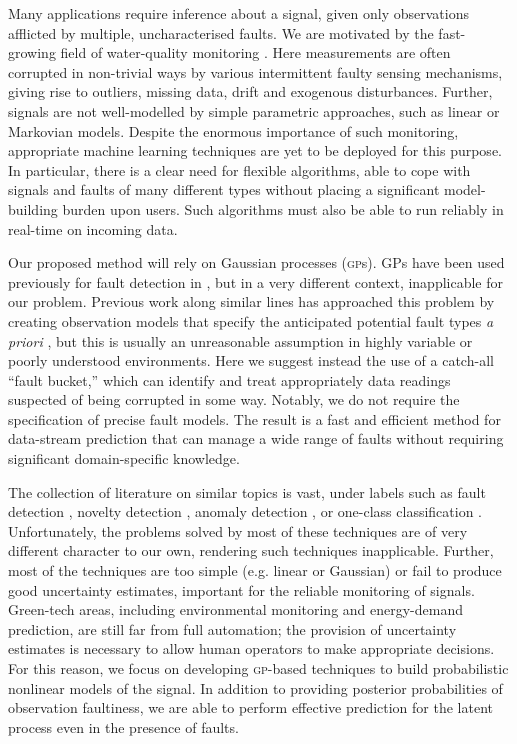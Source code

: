 \documentclass{article} %
\newcommand{\acro}[1]{\textsc{#1}}
\begin{document}
Many applications require inference about a signal, given only observations afflicted by multiple, uncharacterised faults. We are motivated by the fast-growing field of water-quality monitoring
\citep{wagner2006guidelines}. Here measurements are often corrupted in non-trivial ways by various intermittent faulty sensing mechanisms, giving rise to outliers, missing data, drift and exogenous disturbances. Further, signals are not well-modelled by simple parametric approaches, such as linear or Markovian models. Despite the enormous importance of
such monitoring, appropriate machine learning techniques are yet to be deployed for this purpose. In particular, there is a clear need for flexible algorithms, able to cope with signals and faults of many different types without placing a significant model-building burden upon users. Such algorithms must also be able to run reliably in real-time on incoming data.

Our proposed method will rely on Gaussian processes (\acro{gp}s). GPs have been used previously for fault detection in \citep{Eciolaza2001}, but in a very different context, inapplicable for our problem. Previous work along similar lines has
approached this problem by creating observation models that specify
the anticipated potential fault types \textit{a priori}
\citep{garnettosborne}, but this is usually an unreasonable assumption
in highly variable or poorly understood environments.  Here we suggest instead
the use of a catch-all ``fault bucket,'' which can identify and treat
appropriately data readings suspected of being corrupted in some way. Notably, we do not require the specification of precise fault models. 
The result is a fast and efficient method for data-stream prediction that can manage a
wide range of faults without requiring significant
domain-specific knowledge.

The collection of literature on similar topics is vast, under labels
such as fault detection \citep{Eciolaza2001, deFreitas1996,
  Isermann2005, Ding2008}, novelty detection \citep{Markou2003},
anomaly detection \citep{Chandola:2009}, or one-class classification
\citep{Khan2010}. Unfortunately, the problems solved by most of these techniques are of very different character to our own, rendering such techniques inapplicable. Further, most of the techniques are too simple
(e.g. linear or Gaussian) or fail to produce good uncertainty
estimates, important for the reliable monitoring of
signals. Green-tech areas, including environmental monitoring and
energy-demand prediction, are still far from full
automation; the provision of uncertainty estimates is necessary to allow human operators to make appropriate decisions. For this reason, we focus on developing \acro{gp}-based
techniques to build probabilistic nonlinear models of the signal.  In addition to
providing posterior probabilities of observation faultiness, we are
able to perform effective prediction for the latent process even in
the presence of faults.
\end{document}
